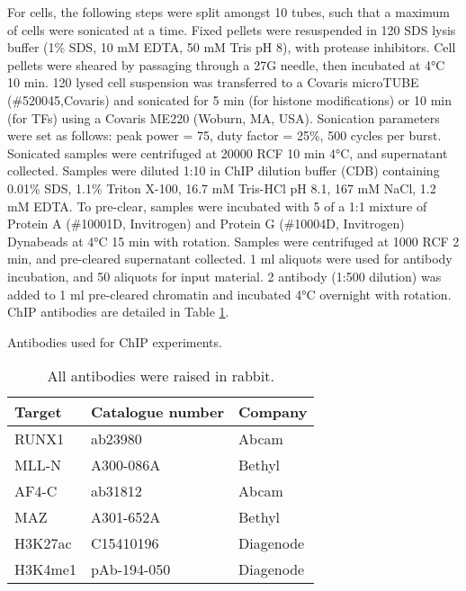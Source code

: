 For  cells, the following steps were split amongst 10 tubes, such that a maximum of  cells were sonicated at a time. Fixed pellets were resuspended in 120 \microl{} SDS lysis buffer (1\% SDS, 10 mM EDTA, 50 mM Tris pH 8), with protease inhibitors. Cell pellets were sheared by passaging through a 27G needle, then incubated at 4°C 10 min. 120 \microl{} lysed cell suspension was transferred to a Covaris microTUBE (\#520045,Covaris) and sonicated for 5 min (for histone modifications) or 10 min (for TFs) using a Covaris ME220 (Woburn, MA, USA). Sonication parameters were set as follows: peak power = 75, duty factor = 25\%, 500 cycles per burst. Sonicated samples were centrifuged at 20000 RCF 10 min 4°C, and supernatant collected. Samples were diluted 1:10 in ChIP dilution buffer (CDB) containing 0.01\% SDS, 1.1\% Triton X-100, 16.7 mM Tris-HCl pH 8.1, 167 mM NaCl, 1.2 mM EDTA. To pre-clear, samples were incubated with 5 \microl{} of a 1:1 mixture of Protein A (\#10001D, Invitrogen) and Protein G (\#10004D, Invitrogen) Dynabeads at 4°C 15 min with rotation. Samples were centrifuged at 1000 RCF 2 min, and pre-cleared supernatant collected. 1 ml aliquots were used for antibody incubation, and 50 \microl{} aliquots for input material. 2 \microl{} antibody (1:500 dilution) was added to 1 ml pre-cleared chromatin and incubated 4°C overnight with rotation. ChIP antibodies are detailed in Table \ref{tbl:ch2_chip-antibodies}.

    \begin{table}[ht]
    \centering
    \caption{Antibodies used for ChIP experiments.}
    \begin{tabular}{@{}lll@{}}
    \toprule
    \textbf{Target} & \textbf{Catalogue number} & \textbf{Company} \\ \midrule
    RUNX1 & ab23980 & Abcam \\
    MLL-N & A300-086A & Bethyl \\
    AF4-C & ab31812 & Abcam \\
    MAZ & A301-652A & Bethyl \\
    H3K27ac & C15410196 & Diagenode \\
    H3K4me1 & pAb-194-050 & Diagenode \\ \bottomrule
    \end{tabular}
    \caption*{All antibodies were raised in rabbit.}
    \label{tbl:ch2_chip-antibodies}
    \end{table}

